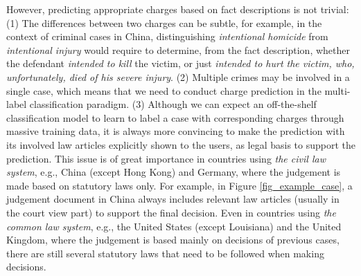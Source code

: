 However, predicting appropriate charges based on fact descriptions is not trivial:
(1) The differences between two charges can be subtle, for example, in the context of criminal cases in China, 
distinguishing \emph{intentional homicide} from \emph{intentional injury} would require to determine, 
from the fact description, whether the defendant  \textit{intended to kill} the victim, 
or just \textit{intended to hurt the victim, who, unfortunately, died of his severe injury}.
(2) Multiple crimes may be involved in a single case, which means that we need to conduct charge prediction in the multi-label classification paradigm. 
(3) Although we can expect an off-the-shelf classification model to learn to label a case with corresponding charges %
through massive training data,  it is always more convincing to make the prediction with its involved law articles explicitly shown to the users, as  legal basis to support the prediction. %
This issue is of great importance in countries using \textit{the civil law system}, e.g., China (except Hong Kong) and Germany, where the judgement is made based on statutory laws only. 
For example, in Figure \ref{fig_example_case}, a judgement document in China always includes relevant law articles (usually in the court view part) to support the final decision.  
Even in countries using \textit{the common law system}, e.g., the United States (except Louisiana) and the United Kingdom, where the judgement is based mainly on decisions of previous cases, there are still several statutory laws that need to be followed when making decisions. 


